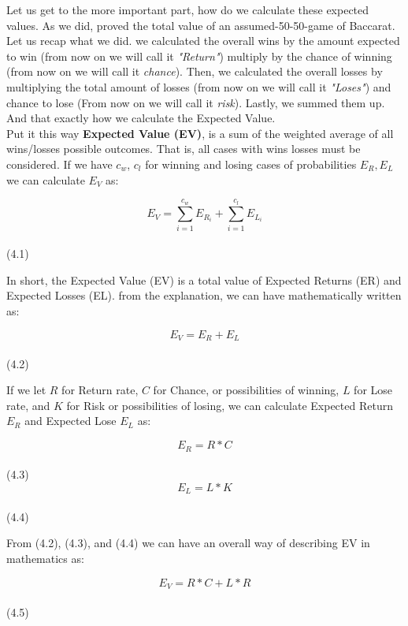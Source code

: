 \documentclass{article}
\begin{document}
Let us get to the more important part, how do we calculate these expected values.  As we did, proved the total value of an assumed-50-50-game of Baccarat.  \\

Let us recap what we did.  we calculated the overall wins by the amount expected to win (from now on we will call it \emph{"Return"}) multiply by the chance of winning (from now on we will call it \emph{chance}).   Then, we calculated the overall losses by multiplying the total amount of losses (from now on we will call it \emph{"Loses"}) and chance to lose (From now on we will call it \emph{risk}).  Lastly, we summed them up.  And that exactly how we calculate the Expected Value.\\

Put it this way \textbf{Expected Value (EV)}, is a sum of the weighted average of all wins/losses possible outcomes.  That is, all cases with wins losses must be considered.  If we have $c_w$, $c_l$ for winning and losing cases of probabilities  $E_R, E_L$ we can calculate $E_V$ as:\par
\begin{center}
$$E_V=\sum_{i=1}^{c_w}E_{R_i}+\sum_{i=1}^{c_l}E_{L_i}$$\\(4.1)\\
\end{center}

In short, the Expected Value (EV) is a total value of Expected Returns (ER) and Expected Losses (EL).  from the explanation, we can have mathematically written as:\par
\begin{center}
$$E_V=E_R+E_L$$\\(4.2)\\
\end{center}
If we let $R$ for Return rate, $C$ for Chance, or possibilities of winning, $L$ for Lose rate, and $K$ for Risk or possibilities of losing, we can calculate Expected Return $E_R$ and Expected Lose $E_L$ as:\par
\begin{center}
$$E_R=R*C$$ \\ (4.3) \\
$$E_L=L*K$$ \\ (4.4) \\
\end{center}

From (4.2), (4.3), and (4.4) we can have an overall way of describing EV in mathematics as:\par
\begin{center}
$$E_V= R*C+L*R$$\\ 
(4.5)\\
\end{center}
\end{document}
